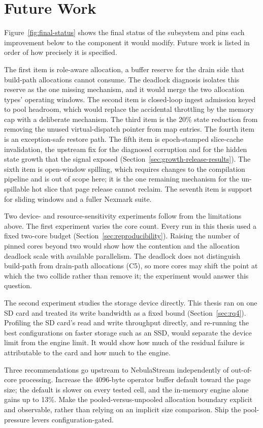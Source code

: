 \section{Future Work\label{sec:future}}

Figure~\ref{fig:final-status} shows the final status of the subsystem and pins
each improvement below to the component it would modify.
Future work is listed in order of how precisely it is specified.


The first item is role-aware allocation, a buffer reserve for the drain side that build-path allocations cannot consume.
The deadlock diagnosis isolates this reserve as the one missing mechanism, and it would merge the two allocation types' operating windows.
The second item is closed-loop ingest admission keyed to pool headroom, which would replace the accidental throttling by the memory cap with a deliberate mechanism.
The third item is the 20\% state reduction from removing the unused virtual-dispatch pointer from map entries.
The fourth item is an exception-safe restore path.
The fifth item is epoch-stamped slice-cache invalidation, the upstream fix for the diagnosed corruption and for the hidden state growth that the signal exposed (Section~\ref{sec:growth-release-results}).
The sixth item is open-window spilling, which requires changes to the compilation pipeline and is out of scope here; it is the one remaining mechanism for the un-spillable hot slice that page release cannot reclaim.
The seventh item is support for sliding windows and a fuller Nexmark suite.

Two device- and resource-sensitivity experiments follow from the limitations above.
The first experiment varies the core count.
Every run in this thesis used a fixed two-core budget (Section~\ref{sec:reproducibility}).
Raising the number of pinned cores beyond two would show how the contention and the allocation deadlock scale with available parallelism.
The deadlock does not distinguish build-path from drain-path allocations (C5), so more cores may shift the point at which the two collide rather than remove it; the experiment would answer this question.

The second experiment studies the storage device directly.
This thesis ran on one SD card and treated its write bandwidth as a fixed bound (Section~\ref{sec:rq4}).
Profiling the SD card's read and write throughput directly, and re-running the best configurations on faster storage such as an \ac{SSD}, would separate the device limit from the engine limit.
It would show how much of the residual failure is attributable to the card and how much to the engine.

Three recommendations go upstream to NebulaStream independently of out-of-core processing.
Increase the 4096-byte operator buffer default toward the page size; the default is slower on every tested cell, and the in-memory engine alone gains up to 13\%.
Make the pooled-versus-unpooled allocation boundary explicit and observable, rather than relying on an implicit size comparison.
Ship the pool-pressure levers configuration-gated.
